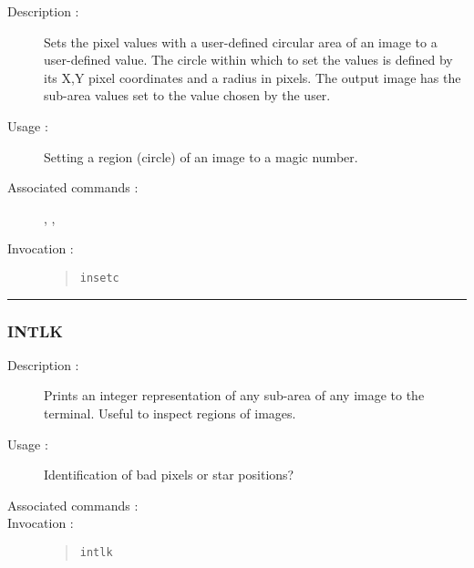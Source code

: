 \begin{description}

\item[Description :] Sets the pixel values with a user-defined circular
area of an image to a user-defined value.  The circle within which to
set the values is defined by its X,Y pixel coordinates and a radius in
pixels. The output image has the sub-area values set to the value
chosen by the user.

\item[Usage :] Setting a region (circle) of an image to a magic number.

\item[Associated commands :] {\tt {}},
{\tt {}}, {\tt {}}

\item[Invocation :]

\begin{quote}{\tt  insetc }\end{quote}

\end{description}

\hrule
\subsubsection*{\label{INTLK}INTLK}

\begin{description}

\item[Description :] Prints an integer representation of any sub-area
of any image to the terminal.  Useful to inspect regions of images.

\item[Usage :] Identification of bad pixels or star positions?
\item[Associated commands :] {\tt {}}
\item[Invocation :]

\begin{quote}{\tt  intlk }\end{quote}

\end{description}

%
%
%
%
%
%

